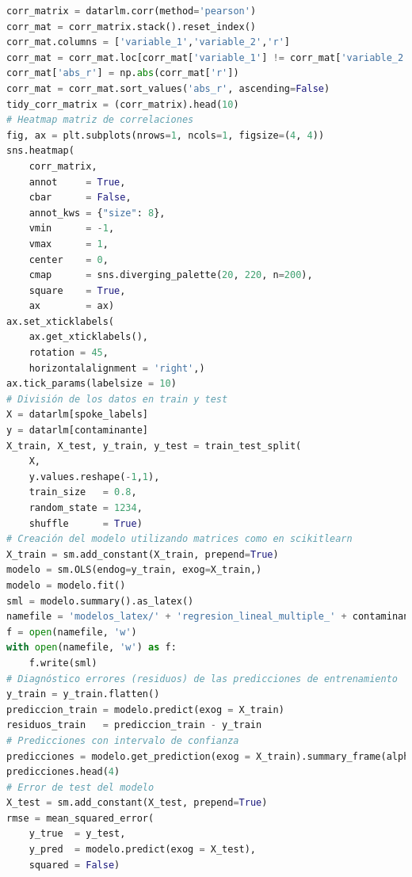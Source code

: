 \clearpage
\begin{lstlisting}[language=Python, caption=Generación de los modelos de regresión lineal múltiple., label=lst:c5]
corr_matrix = datarlm.corr(method='pearson')
corr_mat = corr_matrix.stack().reset_index()
corr_mat.columns = ['variable_1','variable_2','r']
corr_mat = corr_mat.loc[corr_mat['variable_1'] != corr_mat['variable_2'], :]
corr_mat['abs_r'] = np.abs(corr_mat['r'])
corr_mat = corr_mat.sort_values('abs_r', ascending=False)
tidy_corr_matrix = (corr_matrix).head(10)
# Heatmap matriz de correlaciones
fig, ax = plt.subplots(nrows=1, ncols=1, figsize=(4, 4))
sns.heatmap(
    corr_matrix,
    annot     = True,
    cbar      = False,
    annot_kws = {"size": 8},
    vmin      = -1,
    vmax      = 1,
    center    = 0,
    cmap      = sns.diverging_palette(20, 220, n=200),
    square    = True,
    ax        = ax)
ax.set_xticklabels(
    ax.get_xticklabels(),
    rotation = 45,
    horizontalalignment = 'right',)
ax.tick_params(labelsize = 10)
# División de los datos en train y test
X = datarlm[spoke_labels]
y = datarlm[contaminante]
X_train, X_test, y_train, y_test = train_test_split(
    X,
    y.values.reshape(-1,1),
    train_size   = 0.8,
    random_state = 1234,
    shuffle      = True)
# Creación del modelo utilizando matrices como en scikitlearn
X_train = sm.add_constant(X_train, prepend=True)
modelo = sm.OLS(endog=y_train, exog=X_train,)
modelo = modelo.fit()
sml = modelo.summary().as_latex()
namefile = 'modelos_latex/' + 'regresion_lineal_multiple_' + contaminante + '_' + año + '.tex'
f = open(namefile, 'w')
with open(namefile, 'w') as f:
    f.write(sml)
# Diagnóstico errores (residuos) de las predicciones de entrenamiento
y_train = y_train.flatten()
prediccion_train = modelo.predict(exog = X_train)
residuos_train   = prediccion_train - y_train
# Predicciones con intervalo de confianza 
predicciones = modelo.get_prediction(exog = X_train).summary_frame(alpha=0.05)
predicciones.head(4)
# Error de test del modelo 
X_test = sm.add_constant(X_test, prepend=True)
rmse = mean_squared_error(
    y_true  = y_test,
    y_pred  = modelo.predict(exog = X_test),
    squared = False)
\end{lstlisting}

